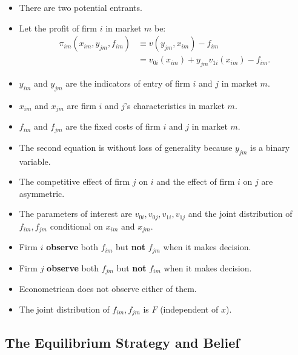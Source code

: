 \documentclass[
]{book}
\providecommand{\tightlist}{%
  \setlength{\itemsep}{0pt}\setlength{\parskip}{0pt}}
\begin{document}
\begin{itemize}
\tightlist
\item
  There are two potential entrants.
\item
  Let the profit of firm \(i\) in market \(m\) be:
  \[
  \begin{split}
  \pi_{im}(x_{im}, y_{jm}, f_{im}) & \equiv v(y_{jm}, x_{im}) - f_{im}\\
  &=v_{0i}(x_{im}) + y_{jm} v_{1i}(x_{im}) - f_{im}.
  \end{split}
  \]
\item
  \(y_{im}\) and \(y_{jm}\) are the indicators of entry of firm \(i\) and \(j\) in market \(m\).
\item
  \(x_{im}\) and \(x_{jm}\) are firm \(i\) and \(j\)'s characteristics in market \(m\).
\item
  \(f_{im}\) and \(f_{jm}\) are the fixed costs of firm \(i\) and \(j\) in market \(m\).
\item
  The second equation is without loss of generality because \(y_{jm}\) is a binary variable.
\item
  The competitive effect of firm \(j\) on \(i\) and the effect of firm \(i\) on \(j\) are asymmetric.
\item
  The parameters of interest are \(v_{0i}, v_{0j}, v_{1i}, v_{1j}\) and the joint distribution of \(f_{im}, f_{jm}\) conditional on \(x_{im}\) and \(x_{jm}\).
\item
  Firm \(i\) \textbf{observe} both \(f_{im}\) but \textbf{not} \(f_{jm}\) when it makes decision.
\item
  Firm \(j\) \textbf{observe} both \(f_{jm}\) but \textbf{not} \(f_{im}\) when it makes decision.
\item
  Econometrican does not observe either of them.
\item
  The joint distribution of \(f_{im}, f_{jm}\) is \(F\) (independent of \(x\)).
\end{itemize}

\hypertarget{the-equilibrium-strategy-and-belief}{%
\subsection{The Equilibrium Strategy and Belief}\label{the-equilibrium-strategy-and-belief}}
\end{document}
